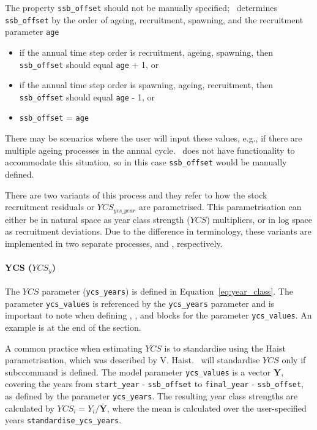 The property \texttt{ssb\_offset} should not be manually specified; \CNAME~determines \texttt{ssb\_offset} by the order of ageing, recruitment, spawning, and the recruitment parameter \texttt{age}

\begin{itemize}
	\item if the annual time step order is recruitment, ageing, spawning, then \texttt{ssb\_offset} should equal \texttt{age} + 1, or
	\item if the annual time step order is spawning, ageing, recruitment, then \texttt{ssb\_offset} should equal \texttt{age} - 1, or
	\item \texttt{ssb\_offset} = \texttt{age}
\end{itemize}

There may be scenarios where the user will input these values, e.g., if there are multiple ageing processes in the annual cycle. \CNAME~does not have functionality to accommodate this situation, so in this case \texttt{ssb\_offset} would be manually defined.

There are two variants of this process and they refer to how the stock recruitment residuals or $YCS_{ycs\_year}$ are parametrised. This parametrisation can either be in natural space as year class strength ($YCS$) multipliers, or in log space as recruitment deviations. Due to the difference in terminology, these variants are implemented in two separate processes,  and , respectively.

\paragraph*{YCS ($YCS_y$)}

The $YCS$ parameter (\texttt{ycs\_years}) is defined in Equation~\eqref{eq:year_class}. The parameter \texttt{ycs\_values} is referenced by the \texttt{ycs\_years} parameter and is important to note when defining , , and  blocks for the parameter \texttt{ycs\_values}. An example is at the end of the section.

A common practice when estimating $YCS$ is to standardise using the Haist parametrisation, which was described by V. Haist. \CNAME~will standardise $YCS$ only if subccommand  is defined. The model parameter \texttt{ycs\_values} is a vector \textbf{Y}, covering the years from \texttt{start\_year} - \texttt{ssb\_offset} to \texttt{final\_year} - \texttt{ssb\_offset}, as defined by the parameter \texttt{ycs\_years}. The resulting year class strengths are calculated by $YCS_i=Y_i/\bar{\textbf{Y}}$, where the mean is calculated over the user-specified years \texttt{standardise\_ycs\_years}.

